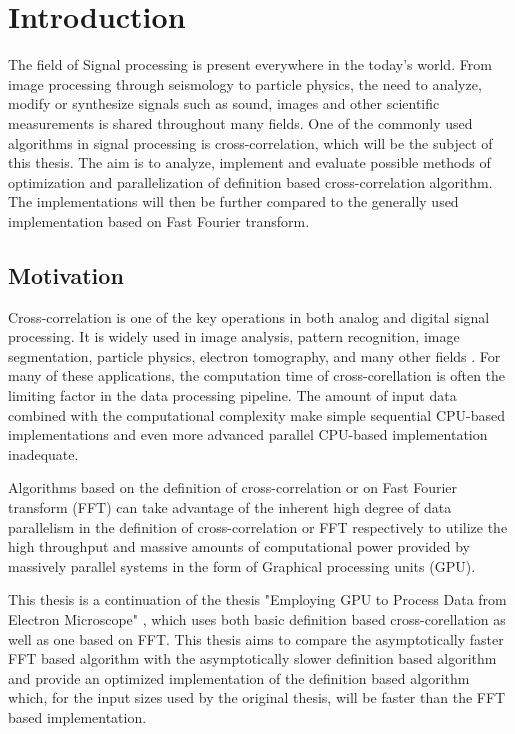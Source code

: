 \chapter*{Introduction}

The field of Signal processing is present everywhere in the today's world. From image processing through seismology to particle physics, the need to analyze, modify or synthesize signals such as sound, images and other scientific measurements is shared throughout many fields. One of the commonly used algorithms in signal processing is cross-correlation, which will be the subject of this thesis. The aim is to analyze, implement and evaluate possible methods of optimization and parallelization of definition based cross-correlation algorithm. The implementations will then be further compared to the generally used implementation based on Fast Fourier transform.

\section*{Motivation}

Cross-correlation is one of the key operations in both analog and digital signal processing.
It is widely used in image analysis, pattern recognition, image segmentation, particle physics, electron tomography, and many other fields \citep{Kapinchev2015}. For many of these applications, the computation time of cross-corellation is often the limiting factor in the data processing pipeline. The amount of input data combined with the computational complexity make simple sequential CPU-based implementations and even more advanced parallel CPU-based implementation inadequate.

Algorithms based on the definition of cross-correlation or on Fast Fourier transform (FFT) can take advantage of the inherent high degree of data parallelism in the definition of cross-correlation or FFT respectively to utilize the high throughput and massive amounts of computational power provided by massively parallel systems in the form of Graphical processing units (GPU).

This thesis is a continuation of the thesis "Employing GPU to Process Data from Electron Microscope" \citep{misko}, which uses both basic definition based cross-corellation as well as one based on FFT. This thesis aims to compare the asymptotically faster FFT based algorithm with the asymptotically slower definition based algorithm and provide an optimized implementation of the definition based algorithm which, for the input sizes used by the original thesis, will be faster than the FFT based implementation.

